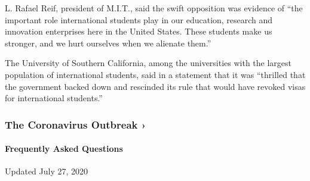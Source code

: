 L. Rafael Reif, president of M.I.T., said the swift opposition was
evidence of ``the important role international students play in our
education, research and innovation enterprises here in the United
States. These students make us stronger, and we hurt ourselves when we
alienate them.''

The University of Southern California, among the universities with the
largest population of international students, said in a statement that
it was ``thrilled that the government backed down and rescinded its rule
that would have revoked visas for international students.''

\href{https://www.nytimes.com/news-event/coronavirus?action=click\&pgtype=Article\&state=default\&region=MAIN_CONTENT_3\&context=storylines_faq}{}

\hypertarget{the-coronavirus-outbreak-}{%
\subsubsection{The Coronavirus Outbreak
›}\label{the-coronavirus-outbreak-}}

\hypertarget{frequently-asked-questions}{%
\paragraph{Frequently Asked
Questions}\label{frequently-asked-questions}}

Updated July 27, 2020

